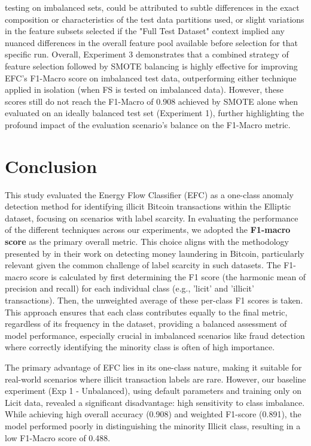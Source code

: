 \documentclass[12pt]{article}
\begin{document}
testing on imbalanced sets, could be attributed to subtle differences in the exact composition or characteristics of the
test data partitions used, or slight variations in the feature subsets selected if the "Full Test Dataset" context implied
any nuanced differences in the overall feature pool available before selection for that specific run.
Overall, Experiment 3 demonstrates that a combined strategy of feature selection followed by SMOTE balancing is highly
effective for improving EFC's F1-Macro score on imbalanced test data, outperforming either technique applied in isolation
(when FS is tested on imbalanced data). However, these scores still do not reach the F1-Macro of 0.908 achieved by SMOTE
alone when evaluated on an ideally balanced test set (Experiment 1), further highlighting the profound impact of the
evaluation scenario's balance on the F1-Macro metric.

\section{Conclusion} \label{section:conclusion}

This study evaluated the Energy Flow Classifier (EFC) as a one-class anomaly detection method for identifying illicit Bitcoin
transactions within the Elliptic dataset, focusing on scenarios with label scarcity. In evaluating the performance of the
different techniques across our experiments, we adopted the \textbf{F1-macro score} as the primary overall metric. This
choice aligns with the methodology presented by \cite{lorenz2021machinelearningmethodsdetect} in their work
on detecting money laundering in Bitcoin, particularly relevant given the common challenge of label scarcity in such datasets.
The F1-macro score is calculated by first determining the F1 score (the harmonic mean of precision and recall) for each
individual class (e.g., 'licit' and 'illicit' transactions). Then, the unweighted average of these per-class F1 scores is
taken. This approach ensures that each class contributes equally to the final metric, regardless of its frequency in the
dataset, providing a balanced assessment of model performance, especially crucial in imbalanced scenarios like fraud detection
where correctly identifying the minority class is often of high importance.

The primary advantage of EFC lies in its one-class nature, making it suitable for real-world scenarios where illicit
transaction labels are rare. However, our baseline experiment (Exp 1 - Unbalanced), using default parameters and training
only on Licit data, revealed a significant disadvantage: high sensitivity to class imbalance. While achieving high overall
accuracy (0.908) and weighted F1-score (0.891), the model performed poorly in distinguishing the minority Illicit class,
resulting in a low F1-Macro score of 0.488.
\end{document}
